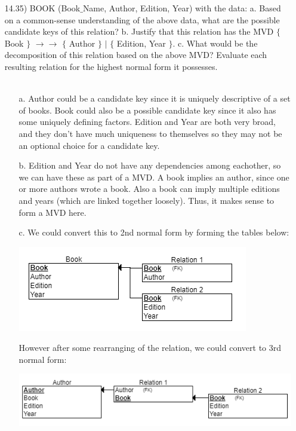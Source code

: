 \documentclass[12pt]{article}
\begin{document}
\begin{enumerate}
	\item[14.35)] BOOK (Book$\_$Name, Author, Edition, Year) with the data: a. Based on a common-sense understanding of the above data, what are the possible candidate keys of this relation? b. Justify that this relation has the MVD $\{$ Book $\}$ $\rightarrow \rightarrow$ $\{$ Author $\}$ $|$ $\{$ Edition, Year $\}$. c. What would be the decomposition of this relation based on the above MVD? Evaluate each resulting relation for the highest normal form it possesses. \\ \\
	\begin{itemize}
		\item[a.] Author could be a candidate key since it is uniquely descriptive of a set of books. Book could also be a possible candidate key since it also has some uniquely defining factors. Edition and Year are both very broad, and they don't have much uniqueness to themselves so they may not be an optional choice for a candidate key.
		\item[b.] Edition and Year do not have any dependencies among eachother, so we can have these as part of a MVD. A book implies an author, since one or more authors wrote a book. Also a book can imply multiple editions and years (which are linked together loosely). Thus, it makes sense to form a MVD here.
		\item[c.] We could convert this to 2nd normal form by forming the tables below:
		\begin{center}
			\includegraphics[scale=1]{hw7r4}
		\end{center}
		However after some rearranging of the relation, we could convert to 3rd normal form:
		\begin{center}
			\includegraphics[scale=1]{hw7r5}
		\end{center}
	\end{itemize}

\end{enumerate}
\end{document}
